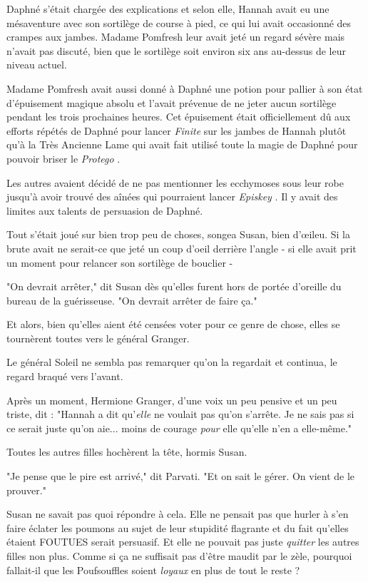 Daphné s'était chargée des explications et selon elle, Hannah avait eu une mésaventure avec son sortilège de course à pied, ce qui lui avait occasionné des crampes aux jambes. Madame Pomfresh leur avait jeté un regard sévère mais n'avait pas discuté, bien que le sortilège soit environ six ans au-dessus de leur niveau actuel.

Madame Pomfresh avait aussi donné à Daphné une potion pour pallier à son état d'épuisement magique absolu et l'avait prévenue de ne jeter aucun sortilège pendant les trois prochaines heures. Cet épuisement était officiellement dû aux efforts répétés de Daphné pour lancer \emph{Finite}  sur les jambes de Hannah plutôt qu'à la Très Ancienne Lame qui avait fait utilisé toute la magie de Daphné pour pouvoir briser le \emph{Protego} .

Les autres avaient décidé de ne pas mentionner les ecchymoses sous leur robe jusqu'à avoir trouvé des aînées qui pourraient lancer \emph{Episkey} . Il y avait des limites aux talents de persuasion de Daphné.

Tout s'était joué sur bien trop peu de choses, songea Susan, bien d'œileu. Si la brute avait ne serait-ce que jeté un coup d'oeil derrière l'angle - si elle avait prit un moment pour relancer son sortilège de bouclier -

"On devrait arrêter," dit Susan dès qu'elles furent hors de portée d'oreille du bureau de la guérisseuse. "On devrait arrêter de faire ça."

Et alors, bien qu'elles aient été censées voter pour ce genre de chose, elles se tournèrent toutes vers le général Granger.

Le général Soleil ne sembla pas remarquer qu'on la regardait et continua, le regard braqué vers l'avant.

Après un moment, Hermione Granger, d'une voix un peu pensive et un peu triste, dit : "Hannah a dit qu'\emph{elle}  ne voulait pas qu'on s'arrête. Je ne sais pas si ce serait juste qu'on aie... moins de courage \emph{pour}  elle qu'elle n'en a elle-même."

Toutes les autres filles hochèrent la tête, hormis Susan.

"Je pense que le pire est arrivé," dit Parvati. "Et on sait le gérer. On vient de le prouver."

Susan ne savait pas quoi répondre à cela. Elle ne pensait pas que hurler à s'en faire éclater les poumons au sujet de leur stupidité flagrante et du fait qu'elles étaient FOUTUES serait persuasif. Et elle ne pouvait pas juste \emph{quitter}  les autres filles non plus. Comme si ça ne suffisait pas d'être maudit par le zèle, pourquoi fallait-il que les Poufsouffles soient \emph{loyaux}  en plus de tout le reste ?

